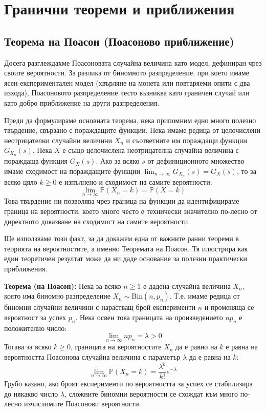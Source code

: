 \documentclass{article}
\begin{document}
\section{Гранични теореми и приближения}

\subsection{Теорема на Поасон (Поасоново приближение)}

Досега разглеждахме Поасоновата случайна величина като модел, дефиниран чрез своите вероятности. За разлика от биномното разпределение, при което имаме ясен експериментален модел (хвърляне на монета или повтаряеми опити с два изхода), Поасоновото разпределение често възниква като граничен случай или като добро приближение на други разпределения. 

Преди да формулираме основната теорема, нека припомним едно много полезно твърдение, свързано с пораждащите функции. Нека имаме редица от целочислени неотрицателни случайни величини $X_n$ и съответните им пораждащи функции $G_{X_n}(s)$. Нека $X$ е също целочислена неотрицателна случайна величина с пораждаща функция $G_X(s)$. Ако за всяко $s$ от дефиниционното множество имаме сходимост на пораждащите функции $\lim_{n \to \infty} G_{X_n}(s) = G_X(s)$, то за всяко цяло $k \ge 0$ е изпълнено и сходимост на самите вероятности:
\[
\lim_{n \to \infty} \mathbb{P}(X_n = k) = \mathbb{P}(X = k)
\]
Това твърдение ни позволява чрез граница на функции да идентифицираме граница на вероятности, което много често е технически значително по-лесно от директното доказване на сходимост на самите вероятности.

Ще използваме този факт, за да докажем една от важните ранни теореми в теорията на вероятностите, а именно Теоремата на Поасон. Тя илюстрира как един теоретичен резултат може да ни даде основание за полезни практически приближения.

\textbf{Теорема (на Поасон):} Нека за всяко $n \ge 1$ е дадена случайна величина $X_n$, която има биномно разпределение $X_n \sim \text{Bin}(n, p_n)$. Т.е. имаме редица от биномни случайни величини с нарастващ брой експерименти $n$ и променяща се вероятност за успех $p_n$. Нека освен това границата на произведението $n p_n$ е положително число:
\[
\lim_{n \to \infty} n p_n = \lambda > 0
\]
Тогава за всяко $k \ge 0$, границата на вероятностите $X_n$ да е равно на $k$ е равна на вероятността Поасонова случайна величина с параметър $\lambda$ да е равна на $k$:
\[
\lim_{n \to \infty} \mathbb{P}(X_n = k) = \frac{\lambda^k}{k!} e^{-\lambda}
\]
Грубо казано, ако броят експерименти по вероятността за успех се стабилизира до някакво число $\lambda$, сложните биномни вероятности се схождат към много по-лесно изчислимите Поасонови вероятности. 
\end{document}
